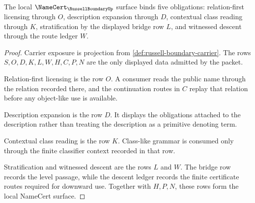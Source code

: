 \begin{theorem}
\label{thm:russell-boundary-fivefold-obligations}
The local $\NameCert_{\RussellBoundaryUp}$ surface binds five obligations: relation-first licensing through $O$, description expansion through $D$, contextual class reading through $K$, stratification by the displayed bridge row $L$, and witnessed descent through the route ledger $W$.
\end{theorem}
\begin{proof}
Carrier exposure is projection from \autoref{def:russell-boundary-carrier}. The rows $S,O,D,K,L,W,H,C,P,N$ are the only displayed data admitted by the packet.

Relation-first licensing is the row $O$. A consumer reads the public name through the relation recorded there, and the continuation routes in $C$ replay that relation before any object-like use is available.

Description expansion is the row $D$. It displays the obligations attached to the description rather than treating the description as a primitive denoting term.

Contextual class reading is the row $K$. Class-like grammar is consumed only through the finite classifier context recorded in that row.

Stratification and witnessed descent are the rows $L$ and $W$. The bridge row records the level passage, while the descent ledger records the finite certificate routes required for downward use. Together with $H,P,N$, these rows form the local NameCert surface.
\end{proof}

